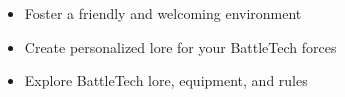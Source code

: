 \begin{itemize}

\item Foster a friendly and welcoming environment

\item Create personalized lore for your BattleTech forces

\item Explore BattleTech lore, equipment, and rules

\end{itemize}
